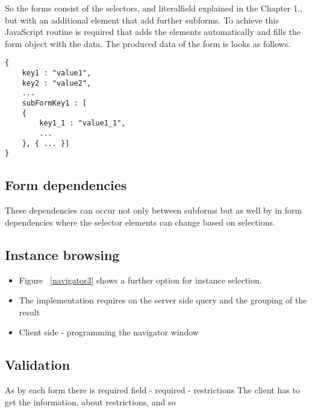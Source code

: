 So the forms consist of the selectors, and literalfield explained in the Chapter 1., but with an additional element that add further subforms. To achieve this JavaScript routine is required that adds the elements automatically and fills the form object with the data. The produced data of the form is looks as follows.


\begin{lstlisting}[captionpos=b, caption=JSON object of the form, label=3rd:sparql,
basicstyle=\footnotesize,frame=single]
{
	key1 : "value1",
	key2 : "value2",
	...
	subFormKey1 : [
	{
		key1_1 : "value1_1",
		...				
	}, { ... }]
}
\end{lstlisting}


\subsection{Form dependencies} \label{formDependencies}



These dependencies can occur not only between subforms but as well by in form dependencies where the selector elements can change based on selections.

\subsection{Instance browsing}


\begin{itemize}
	\item Figure ~\ref{navigator3} shows a further option for instance selection. 
\end{itemize}


\begin{itemize}
	\item The implementation requires on the server side query and the grouping of the result
	\item Client side - programming the navigator window
\end{itemize}


\subsection{Validation}

As by each form there is required field - required - restrictions
The client has to get the information, about restrictions, and so  


